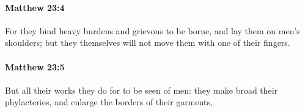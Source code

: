		\paragraph{Matthew 23:4} %
			\label{MATTHEW-23-4}

			For they bind heavy burdens and grievous to be borne, and lay them on men's shoulders; but they themselves will not move them with one of their fingers.

			\begin{framed}
			\scriptsize
				\begin{compactdesc}
					\item[SBLG] 
				\end{compactdesc}
			\end{framed}

		\paragraph{Matthew 23:5} %
			\label{MATTHEW-23-5}

			But all their works they do for to be seen of men: they make broad their phylacteries, and enlarge the borders of their garments,


